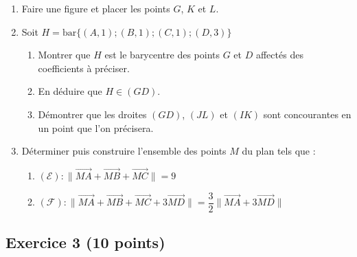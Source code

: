\documentclass[12pt,a4paper]{article}
\begin{document}
\begin{enumerate}
    \item Faire une figure et placer les points $G$, $K$ et $L$.
    \item Soit $H=\text{bar}\{(A,1); (B, 1); (C, 1); (D, 3)\}$
    \begin{enumerate}
        \item Montrer que $H$ est le barycentre des points $G$ et $D$ affectés des coefficients à préciser.
        \item En déduire que $H \in (GD)$.
        \item Démontrer que les droites $(GD)$, $(JL)$ et $(IK)$ sont concourantes en un point que l'on précisera.
    \end{enumerate}
    \item Déterminer puis construire l'ensemble des points $M$ du plan tels que :
    \begin{enumerate}
        \item $(\mathcal{E}) : \|\overrightarrow{MA}+\overrightarrow{MB}+\overrightarrow{MC}\|=9$
        \item $(\mathcal{F}) : \|\overrightarrow{MA}+\overrightarrow{MB}+\overrightarrow{MC}+3\overrightarrow{MD}\|=\dfrac{3}{2}\|\overrightarrow{MA}+3\overrightarrow{MD}\|$
    \end{enumerate}
\end{enumerate}

\smallbreak
\hrulefill
\smallbreak

\subsection*{Exercice 3 \hfill (10 points)}
\end{document}
